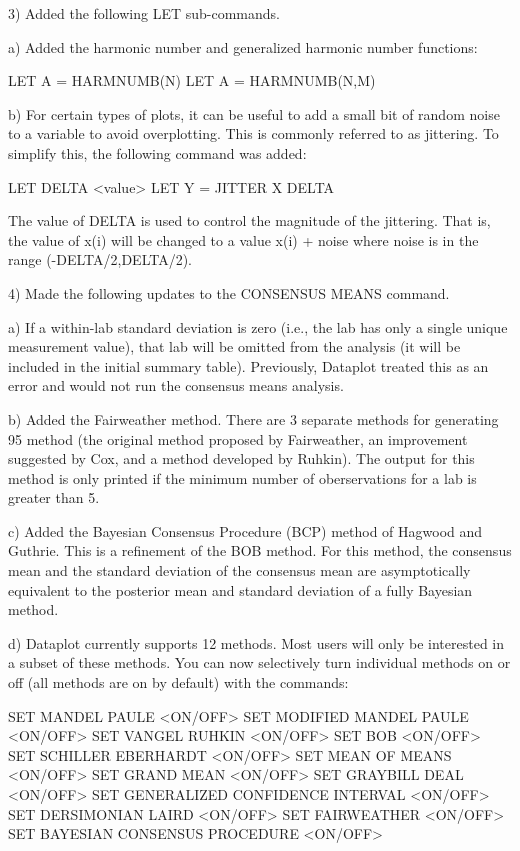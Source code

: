 { 3) Added the following LET sub-commands.

    a) Added the harmonic number and generalized harmonic
       number functions:

           LET A = HARMNUMB(N)
           LET A = HARMNUMB(N,M)

    b) For certain types of plots, it can be useful to add a
       small bit of random noise to a variable to avoid
       overplotting.  This is commonly referred to as jittering.
       To simplify this, the following command was added:

           LET DELTA <value>
           LET Y = JITTER X DELTA

       The value of DELTA is used to control the magnitude of
       the jittering.  That is, the value of x(i) will be
       changed to a value x(i) + noise where noise is in the
       range (-DELTA/2,DELTA/2).

 4) Made the following updates to the CONSENSUS MEANS command.

    a) If a within-lab standard deviation is zero (i.e., the lab
       has only a single unique measurement value), that lab
       will be omitted from the analysis (it will be included
       in the initial summary table).  Previously, Dataplot
       treated this as an error and would not run the
       consensus means analysis.

    b) Added the Fairweather method.  There are 3 separate
       methods for generating 95%
       method (the original method proposed by Fairweather,
       an improvement suggested by Cox, and a method developed
       by Ruhkin).  The output for this method is only printed
       if the minimum number of oberservations for a lab is
       greater than 5.

    c) Added the Bayesian Consensus Procedure (BCP) method of
       Hagwood and Guthrie.  This is a refinement of the BOB
       method.  For this method, the consensus mean and the
       standard deviation of the consensus mean are asymptotically
       equivalent to the posterior mean and standard deviation of
       a fully Bayesian method.

    d) Dataplot currently supports 12 methods.  Most users will
       only be interested in a subset of these methods.  You
       can now selectively turn individual methods on or off
       (all methods are on by default) with the commands:

          SET MANDEL PAULE <ON/OFF>
          SET MODIFIED MANDEL PAULE <ON/OFF>
          SET VANGEL RUHKIN <ON/OFF>
          SET BOB <ON/OFF>
          SET SCHILLER EBERHARDT <ON/OFF>
          SET MEAN OF MEANS <ON/OFF>
          SET GRAND MEAN <ON/OFF>
          SET GRAYBILL DEAL <ON/OFF>
          SET GENERALIZED CONFIDENCE INTERVAL <ON/OFF>
          SET DERSIMONIAN LAIRD <ON/OFF>
          SET FAIRWEATHER <ON/OFF>
          SET BAYESIAN CONSENSUS PROCEDURE <ON/OFF>

}
